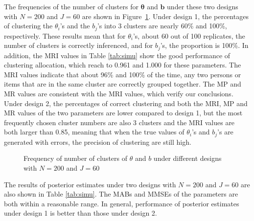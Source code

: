 \documentclass[12pt]{article}
\begin{document}
The frequencies of the number of clusters for $\bm{\theta}$ and $\bm{b}$ under these two designs with $N=200$ and $J=60$ are shown in Figure~\ref{fig:clusterRes}. Under design 1, the percentages of clustering the $\theta_i$'s and the $b_j$'s into 3 clusters are nearly 60\% and 100\%, respectively. These results mean that for $\theta_i$'s, about 60 out of 100 replicates, the number of clusters is correctly inferenced, and for $b_j$'s, the proportion is 100\%. In addition, the MRI values in Table \ref{tab:simu} show the good performance of clustering allocation, which reach to 0.961 and 1.000 for these parameters. The MRI values indicate that about 96\% and 100\% of the time, any two persons or items that are in the same cluster are correctly grouped together. The MP and MR values are consistent with the MRI values, which verify our conclusions.   
Under design 2, the percentages of correct clustering and both the MRI, MP and MR values of  the two parameters are lower compared to design 1, but the most frequently chosen cluster numbers are also 3 clusters and the MRI values are both larger than 0.85, meaning that when the true values of $\theta_i$'s and $b_j$'s are generated with errors, the precision of clustering are still high. 




\begin{figure}[hbp] 
	\centering
	\quad
	\quad
	\quad
	\caption{Frequency of number of clusters of $\theta$ and $b$ under different designs with $N=200$ and $J=60$}
	\label{fig:clusterRes}
\end{figure}


The results of posterior estimates under two designs with $N=200$ and $J=60$ are also shown in Table \ref{tab:simu}. The MABs and MMSEs of the parameters are both within a reasonable range. In general, performance of posterior estimates under design 1 is better than those under design 2.
\end{document}
